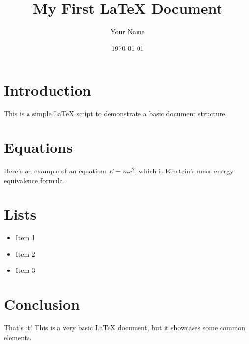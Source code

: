 \documentclass{article}
\title{My First LaTeX Document}
\author{Your Name}
\date{\today}
\begin{document}
\maketitle

\section{Introduction}
This is a simple LaTeX script to demonstrate a basic document structure.

\section{Equations}
Here's an example of an equation: $E = mc^2$, which is Einstein's mass-energy equivalence formula.

\section{Lists}
\begin{itemize}
  \item Item 1
  \item Item 2
  \item Item 3
\end{itemize}

\section{Conclusion}
That's it! This is a very basic LaTeX document, but it showcases some common elements.
\end{document}
